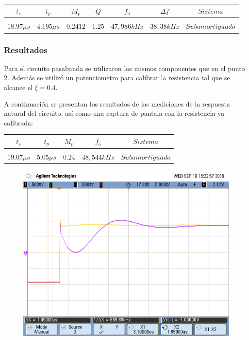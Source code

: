\begin{table}[H]
    \centering
    \begin{tabular}{c c c c c c c}
        $t_s$ & $t_p$ & $M_p$ & $Q$ & $f_o$ & $\Delta f$ & $Sistema$ \\
        \hline \\
        $18.97 \mu s$ & $4.195 \mu s$ & $0.2412$ & $1.25$ & $47,986kHz$ & $38,38kHz$ & $Subamortiguado$ \\
        \hline
    \end{tabular}
\end{table}

\subsubsection{Resultados}
Para el circuito pasabanda se utilizaron los mismos componentes que en el punto 2. Adem\'as se utiliz\'o un potenciometro para calibrar la resistencia tal que se alcance el $\xi = 0.4$. 


A continuaci\'on se presentan los resultados de las mediciones de la respuesta natural del circuito, as\'i como una captura de pantala con la resistencia ya calibrada:


\begin{table}[H]
    \centering
    \begin{tabular}{c c c c c}
        $t_s$ & $t_p$ & $M_p$ & $f_o$ & $Sistema$ \\
        \hline \\
        $19.07 \mu s$ & $5.05 \mu s$ & $0.24$ & $48,544kHz$ & $Subamortiguado$ \\
        \hline
    \end{tabular}
    \label{tab:natural_pasabanda}
\end{table}

\begin{figure}[H]
	\centering
	\includegraphics[scale=0.3]{../Mediciones/Osciloscopio/Rechazabanda_respuesta_escalon/scope_5.png}
\end{figure}

